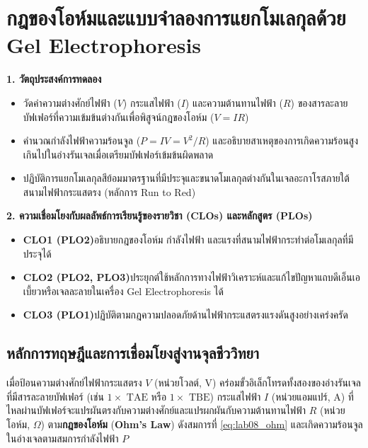 \chapter{กฎของโอห์มและแบบจำลองการแยกโมเลกุลด้วย Gel Electrophoresis}

\begin{planbox}
\textbf{1. วัตถุประสงค์การทดลอง}
\begin{itemize}
    \item วัดค่าความต่างศักย์ไฟฟ้า ($V$) กระแสไฟฟ้า ($I$) และความต้านทานไฟฟ้า ($R$) ของสารละลายบัฟเฟอร์ที่ความเข้มข้นต่างกันเพื่อพิสูจน์กฎของโอห์ม ($V = IR$)
    \item คำนวณกำลังไฟฟ้าความร้อนจูล ($P = IV = V^2/R$) และอธิบายสาเหตุของการเกิดความร้อนสูงเกินไปในอ่างรันเจลเมื่อเตรียมบัฟเฟอร์เข้มข้นผิดพลาด
    \item ปฏิบัติการแยกโมเลกุลสีย้อมมาตรฐานที่มีประจุและขนาดโมเลกุลต่างกันในเจลอะกาโรสภายใต้สนามไฟฟ้ากระแสตรง (หลักการ Run to Red)
\end{itemize}
\textbf{2. ความเชื่อมโยงกับผลลัพธ์การเรียนรู้ของรายวิชา (CLOs) และหลักสูตร (PLOs)}
\begin{itemize}
    \item \textbf{CLO1 (PLO2)}\quad อธิบายกฎของโอห์ม กำลังไฟฟ้า และแรงที่สนามไฟฟ้ากระทำต่อโมเลกุลที่มีประจุได้
    \item \textbf{CLO2 (PLO2, PLO3)}\quad ประยุกต์ใช้หลักการทางไฟฟ้าวิเคราะห์และแก้ไขปัญหาแถบดีเอ็นเอเบี้ยวหรือเจลละลายในเครื่อง Gel Electrophoresis ได้
    \item \textbf{CLO3 (PLO1)}\quad ปฏิบัติตามกฎความปลอดภัยด้านไฟฟ้ากระแสตรงแรงดันสูงอย่างเคร่งครัด
\end{itemize}
\end{planbox}

\section{หลักการทฤษฎีและการเชื่อมโยงสู่งานจุลชีววิทยา}

เมื่อป้อนความต่างศักย์ไฟฟ้ากระแสตรง $V$ (หน่วยโวลต์, $\text{V}$) คร่อมขั้วอิเล็กโทรดทั้งสองของอ่างรันเจลที่มีสารละลายบัฟเฟอร์ (เช่น $1\times\text{ TAE}$ หรือ $1\times\text{ TBE}$) กระแสไฟฟ้า $I$ (หน่วยแอมแปร์, $\text{A}$) ที่ไหลผ่านบัฟเฟอร์จะแปรผันตรงกับความต่างศักย์และแปรผกผันกับความต้านทานไฟฟ้า $R$ (หน่วยโอห์ม, $\Omega$) ตาม\textbf{กฎของโอห์ม} (\textbf{Ohm's Law}) ดังสมการที่ \eqref{eq:lab08_ohm} และเกิดความร้อนจูลในอ่างเจลตามสมการกำลังไฟฟ้า $P$

